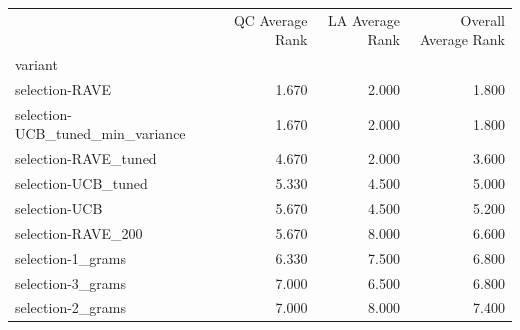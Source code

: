 \begin{tabular}{lrrr}
\toprule
 & QC Average Rank & LA Average Rank & Overall Average Rank \\
variant &  &  &  \\
\midrule
selection-RAVE & 1.670 & 2.000 & 1.800 \\
selection-UCB_tuned_min_variance & 1.670 & 2.000 & 1.800 \\
selection-RAVE_tuned & 4.670 & 2.000 & 3.600 \\
selection-UCB_tuned & 5.330 & 4.500 & 5.000 \\
selection-UCB & 5.670 & 4.500 & 5.200 \\
selection-RAVE_200 & 5.670 & 8.000 & 6.600 \\
selection-1_grams & 6.330 & 7.500 & 6.800 \\
selection-3_grams & 7.000 & 6.500 & 6.800 \\
selection-2_grams & 7.000 & 8.000 & 7.400 \\
\bottomrule
\end{tabular}
